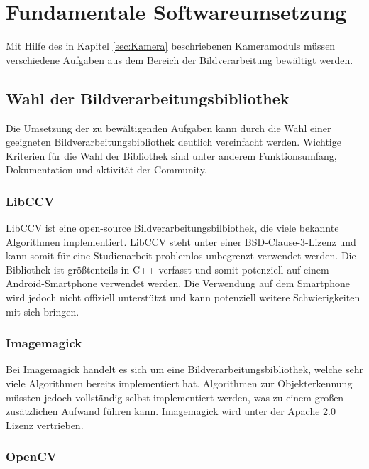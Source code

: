\chapter{Fundamentale Softwareumsetzung}
\label{cha:Software}

Mit Hilfe des in Kapitel \ref{sec:Kamera} beschriebenen Kameramoduls müssen verschiedene Aufgaben aus dem Bereich der Bildverarbeitung bewältigt werden. 

\section{Wahl der Bildverarbeitungsbibliothek}

Die Umsetzung der zu bewältigenden Aufgaben kann durch die Wahl einer geeigneten Bildverarbeitungsbibliothek deutlich vereinfacht werden. Wichtige Kriterien für die Wahl der Bibliothek sind unter anderem Funktionsumfang, Dokumentation und aktivität der Community.

\subsection{LibCCV}

LibCCV \cite{libccv} ist eine open-source Bildverarbeitungsbilbiothek, die viele bekannte Algorithmen implementiert. LibCCV steht unter einer BSD-Clause-3-Lizenz und kann somit für eine Studienarbeit problemlos unbegrenzt verwendet werden. Die Bibliothek ist größtenteils in C++ verfasst und somit potenziell auf einem Android-Smartphone verwendet werden. Die Verwendung auf dem Smartphone wird jedoch nicht offiziell unterstützt und kann potenziell weitere Schwierigkeiten mit sich bringen.

\subsection{Imagemagick}

Bei Imagemagick \cite{imagemagick} handelt es sich um eine Bildverarbeitungsbibliothek, welche sehr viele Algorithmen bereits implementiert hat. Algorithmen zur Objekterkennung müssten jedoch vollständig selbst implementiert werden, was zu einem großen zusätzlichen Aufwand führen kann. Imagemagick wird unter der Apache 2.0 Lizenz vertrieben.

\subsection{OpenCV}
\label{subsec:opencv}

